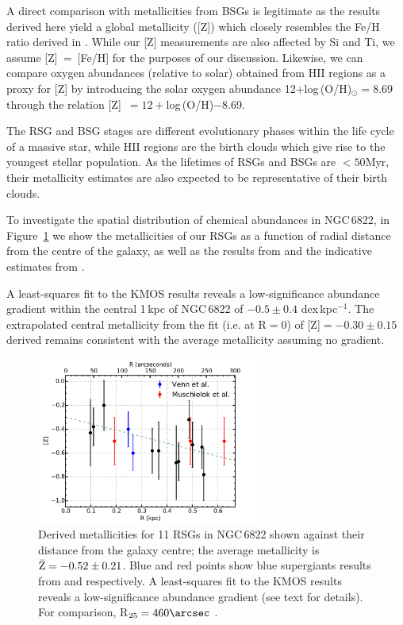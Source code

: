 A direct comparison with metallicities from BSGs is legitimate as the results derived here yield a global metallicity ([Z]) which
closely resembles the Fe/H ratio derived in
\cite{2001ApJ...547..765V}.
While our [Z] measurements are also affected by Si and Ti,
we assume [Z]~=~[Fe/H] for the purposes of our discussion.
Likewise, we can compare oxygen abundances (relative to solar) obtained from HII regions as a proxy for [Z] by
introducing the solar oxygen abundance
{12+log\,(O/H)}$_{\odot}=8.69$
\citep{2009ARA&A..47..481A} through the relation
[Z]~$=12+$log\,(O/H)$-$8.69.

The RSG and BSG stages are different evolutionary phases within the life cycle of a massive star,
while HII regions are the birth clouds which give rise to the youngest stellar population.
As the lifetimes of RSGs and BSGs are $<50$Myr,
their metallicity estimates are also expected to be representative of their birth clouds.

To investigate the spatial distribution of chemical abundances in NGC\,6822,
in Figure~\ref{fig:ZvsR}
we show the metallicities of our RSGs as a function of radial distance from the centre of the galaxy,
as well as the results from
\cite{2001ApJ...547..765V} and the indicative estimates from
\cite{1999A&A...352L..40M}.

A least-squares fit to the KMOS results reveals a low-significance abundance gradient within the central 1\,kpc of NGC\,6822 of $-0.5\pm0.4$ dex\,kpc$^{-1}$.
The extrapolated central metallicity from the fit (i.e. at R$=$0) of [Z]$=-0.30\pm0.15$ derived remains consistent with the average metallicity assuming no gradient.

\begin{figure}
 \centering
\includegraphics[width=0.65\textwidth]{ngc6822/N6822_ZvsR_BSG}
\caption{
Derived metallicities for 11 RSGs in NGC\,6822 shown against their distance from the galaxy centre;
the average metallicity is
$\bar{\rm Z} = -0.52\pm 0.21$.
Blue and red points show blue supergiants results from
\protect\cite{2001ApJ...547..765V} and
\protect\cite{1999A&A...352L..40M} respectively.
A least-squares fit to the KMOS results reveals a low-significance abundance gradient
(see text for details).
For comparison,
R$_{25} = 460\arcsec$
\citep[$=1.03$\,kpc;][]{2012AJ....144....4M}.
        }
\label{fig:ZvsR}
\end{figure}

